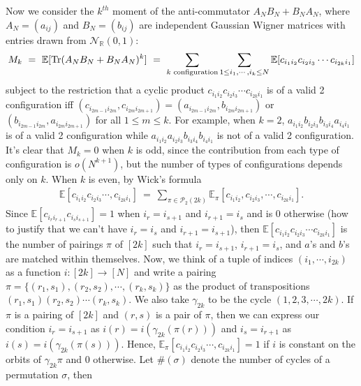 \documentclass[12pt,reqno]{amsart}
\theoremstyle{plain} %
\theoremstyle{remark}
\theoremstyle{definition}
\newcommand{\R}{\mathbb R}
\begin{document}
Now we consider the $k^{th}$ moment of the anti-commutator $A_NB_N+B_NA_N$, where $A_N=(a_{ij})$ and $B_N=(b_{ij})$ are independent Gaussian Wigner matrices with entries drawn from $\mathcal{N}_\R(0,1)$:
\begin{align*}
M_k \ = \ \mathbb{E}[\textup{Tr}(A_NB_N+B_NA_N)^k] \ = \ \sum_{k\textup{ configuration}}\sum_{1\leq i_1,\cdots, i_k\leq N}\mathbb{E}[c_{i_1i_2}c_{i_2i_3}\cdots c_{i_{2k}i_1}]  
\end{align*}
subject to the restriction that a cyclic product $c_{i_1i_2}c_{i_2i_3}\cdots c_{i_{2k}i_1}$ is of a valid 2 configuration iff $(c_{i_{2m-1}i_{2m}}, c_{i_{2m}i_{2m+1}})=(a_{i_{2m-1}i_{2m}}, b_{i_{2m}i_{2m+1}})$ or $(b_{i_{2m-1}i_{2m}}, a_{i_{2m}i_{2m+1}})$ for all $1\leq m\leq k$. For example, when $k=2$, $a_{i_1i_2}b_{i_2i_3}b_{i_3i_4}a_{i_4i_1}$ is of a valid 2 configuration while $a_{i_1i_2}a_{i_2i_3}b_{i_3i_4}b_{i_4i_1}$ is not of a valid 2 configuration.
It's clear that $M_k=0$ when $k$ is odd, since the contribution from each type of configuration is $o(N^{k+1})$, but the number of types of configurations depends only on $k$. When $k$ is even, by Wick's formula
\begin{align*}
\mathbb{E}[c_{i_1i_2}c_{i_2i_3}\cdots, c_{i_{2k}i_1}] \ = \ \sum_{
\pi\in\mathcal{P}_2(2k)}\mathbb{E}_\pi[c_{i_1i_2},c_{i_2i_3},\cdots, c_{i_{2k}i_1}].
\end{align*}
Since $\mathbb{E}[c_{i_ri_{r+1}}c_{i_si_{s+1}}]=1$ when $i_r=i_{s+1}$ and $i_{r+1}=i_{s}$ and is 0 otherwise (how to justify that we can't have $i_{r}=i_s$ and $i_{r+1}=i_{s+1}$), then $\mathbb{E}[c_{i_1i_2}c_{i_2i_3}\cdots c_{i_{2k}i_1}]$ is the number of pairings $\pi$ of $[2k]$ such that $i_r=i_{s+1}$, $i_{r+1}=i_s$, and $a$'s and $b$'s are matched within themselves. Now, we think of a tuple of indices $(i_1,\cdots, i_{2k})$ as a function $i:[2k]\rightarrow [N]$ and write a pairing $\pi=\{(r_1,s_1), (r_2, s_2), \cdots, (r_{k},s_{k})\}$ as the product of transpositions $(r_1,s_1)(r_2,s_2)\cdots(r_k,s_k)$. We also take $\gamma_{2k}$ to be the cycle $(1, 2, 3, \cdots, 2k)$. If $\pi$ is a pairing of $[2k]$ and $(r,s)$ is a pair of $\pi$, then we can express our condition $i_r=i_{s+1}$ as $i(r)=i(\gamma_{2k}(\pi(r)))$ and $i_s=i_{r+1}$ as $i(s)=i(\gamma_{2k}(\pi(s)))$. Hence, $\mathbb{E}_\pi[c_{i_1i_2}c_{i_2i_3}\cdots, c_{i_{2k}i_1}]=1$ if $i$ is constant on the orbits of $\gamma_{2k}\pi$ and $0$ otherwise. Let $\#(\sigma)$ denote the number of cycles of a permutation $\sigma$, then
\end{document}
